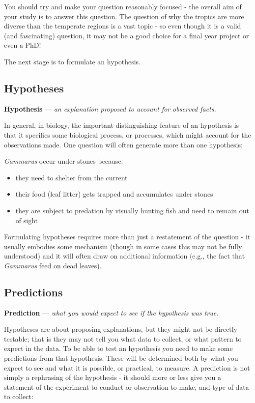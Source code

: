 \documentclass[]{book}
\begin{document}
You should try and make your question reasonably focused - the overall
aim of your study is to answer this question. The question of why the
tropics are more diverse than the temperate regions is a vast topic - so
even though it is a valid (and fascinating) question, it may not be a
good choice for a final year project or even a PhD!

The next stage is to formulate an hypothesis.

\hypertarget{stages-hypotheses}{\subsection{Hypotheses}\label{stages-hypotheses}}

\textbf{Hypothesis} --- \emph{an explanation proposed to account for
observed facts.}

In general, in biology, the important distinguishing feature of an
hypothesis is that it specifies some biological process, or processes,
which might account for the observations made. One question will often
generate more than one hypothesis:

\emph{Gammarus} occur under stones because:

\begin{itemize}
\item
  they need to shelter from the current
\item
  their food (leaf litter) gets trapped and accumulates under stones
\item
  they are subject to predation by visually hunting fish and need to
  remain out of sight
\end{itemize}

Formulating hypotheses requires more than just a restatement of the
question - it usually embodies some mechanism (though in some cases this
may not be fully understood) and it will often draw on additional
information (e.g., the fact that \emph{Gammarus} feed on dead leaves).

\subsection{Predictions}\label{stages-predictions}

\textbf{Prediction} --- \emph{what you would expect to see if the
hypothesis was true}.

Hypotheses are about proposing explanations, but they might not be
directly testable; that is they may not tell you what data to collect,
or what pattern to expect in the data. To be able to test an hypothesis
you need to make some predictions from that hypothesis. These will be
determined both by what you expect to see and what it is possible, or
practical, to measure. A prediction is not simply a rephrasing of the
hypothesis - it should more or less give you a statement of the
experiment to conduct or observation to make, and type of data to
collect:
\end{document}
